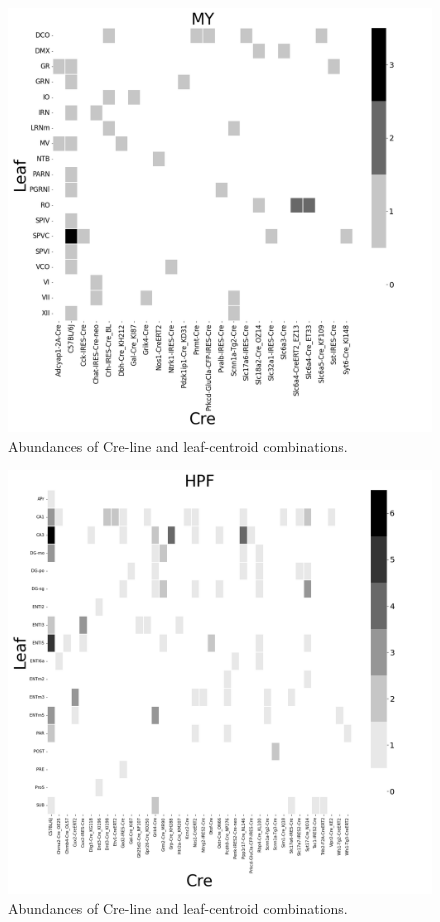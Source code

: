 \begin{figure}[H]
    \centering
    \includegraphics[width = 7in]{figs/MY centroid density.png} 
     \caption{Abundances of Cre-line and leaf-centroid combinations.}
    \label{fig:my_label}
\end{figure}
\newpage

\begin{figure}[H]
    \centering
    \includegraphics[width = 7in]{figs/HPF centroid density.png} 
     \caption{Abundances of Cre-line and leaf-centroid combinations.}
    \label{fig:my_label}
\end{figure}
\newpage

